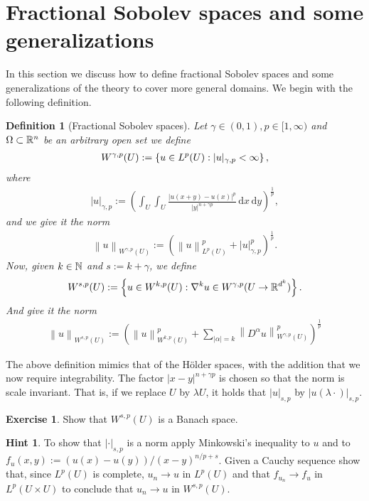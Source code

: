\documentclass[12pt]{article}
\newtheorem{definition}[theorem]{Definition}
\theoremstyle{definition}
\newtheorem{exercise}{Exercise}
\newtheorem*{hint}{Hint}
\renewcommand{\norm}[1]{\left\lVert #1 \right\rVert}\renewcommand{\abs}[1]{\left| #1 \right|}
\renewcommand{\d}{\,\mathrm{d}}
\begin{document}
\section{Fractional Sobolev spaces and  some generalizations}
In this section we discuss how to define fractional Sobolev spaces and some generalizations of the theory to cover more general domains. We begin with the following definition.
\begin{definition}[Fractional Sobolev spaces]
  Let $\gamma  \in (0,1), p \in [1,\infty)$ and $\Omega  \subset \mathbb{R}^n$ be an arbitrary open set we define
  \begin{align*}
    W^{\gamma  ,p}(U):= \left\{u \in L^p(U): | u |_{\gamma,p}<\infty\right\},
  \end{align*}
  where
  \begin{align}\label{fractional seminorm}
    | u |_{\gamma  ,p}:= \left(\int_{U}\int_{U}\frac{\abs{u(x+y)-u(x)}^p}{\abs{y}^{n+\gamma p}}\d x \d y\right)^{\frac{1}{p}},
  \end{align}
  and we give it the norm
  \begin{align*}
    \norm{u}_{W^{\gamma,p}(U)}:= \left(\norm{u}_{L^p(U)}^p+| u |_{\gamma ,p}^p\right)^{\frac{1}{p}}.
  \end{align*}
  Now, given $k \in \mathbb{N}$ and $s:=k+\gamma $, we define
  \begin{align*}
    W^{s ,p}(U):= \left\{u \in W^{k ,p}(U): \nabla^k  u \in W^{\gamma ,p}(U \to \mathbb{R}^{d^k})\right\}.
  \end{align*}
  And give it the norm
  \begin{align}\label{norm def}
    \norm{u}_{W^{s,p}(U)}:= \left(\norm{u}_{W^{k,p}(U)}^p+ \sum_{\abs{\alpha}=k }\norm{D^\alpha u}_{W^{\gamma ,p}(U)}^p\right)^\frac{1}{p}
  \end{align}
\end{definition}
The above definition mimics that of the H\"older spaces, with the addition that we now require integrability. The factor $\abs{x-y}^{n+\gamma p}$ is chosen so that the norm is scale invariant. That is, if we replace $U$ by $\lambda U$, it holds that $|u|_{s,p}$ by $|u(\lambda \cdot )|_{s,p}$.
\begin{exercise}
  Show that $W^{s,p}(U)$ is a Banach space.
\end{exercise}
\begin{hint}
  To show that $| \cdot |_{s,p}$ is a norm apply Minkowski's inequality to $u$ and to $f_u(x,y):=(u(x)-u(y))/(x-y)^{n/p+s}$. Given a Cauchy sequence show that, since $L^p(U)$ is complete, $u_n \to u$ in $L^p(U)$ and that $f_{u_n} \to f_u$ in $L^p(U\times U)$ to conclude that $u_n \to u$ in $W^{s,p}(U)$.
\end{hint}
\end{document}
